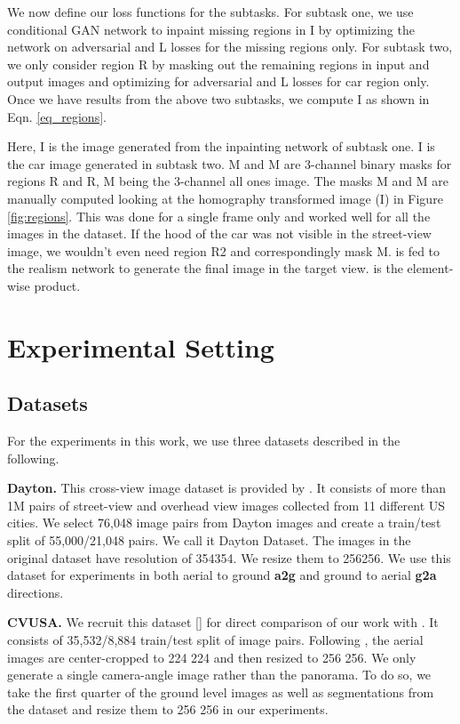 \documentclass[times,twocolumn,final,authoryear]{elsarticle_modified}
\begin{document}
We now define our loss functions for the subtasks.
For subtask one, we use conditional GAN network to inpaint missing regions in I by optimizing the network on adversarial and L losses for the missing regions only. For subtask two, we only consider region R by masking out the remaining regions in input and output images and optimizing for adversarial and L losses for car region only. Once we have results from the above two subtasks, we compute I as shown in Eqn. \ref{eq_regions}. 

\vspace{-15pt}



Here, I is the image generated from the inpainting network of subtask one. I is the car image generated in subtask two. M and M are 3-channel binary masks for regions R and R, M being the 3-channel all ones image. The masks M and M are manually computed looking at the homography transformed image (I) in Figure \ref{fig:regions}. This was done for a single frame only and worked well for all the images in the dataset. If the hood of the car was not visible in the street-view image, we wouldn't even need region R2 and correspondingly mask M.  is fed to the realism network to generate the final image in the target view.  is the element-wise product.


 \vspace{-5pt}
\section{Experimental Setting}
\label{sec:exp_setting}
\vspace{-5pt}
\subsection{Datasets}
For the experiments in this work, we use three datasets described in the following.

\noindent \textbf{Dayton.} This cross-view image dataset is provided by \cite{Vo2016}. It consists of more than 1M pairs of street-view and overhead view images collected from 11 different US cities. We select 76,048 image pairs from Dayton images and create a train/test split of 55,000/21,048 pairs. We call it Dayton Dataset. The images in the original dataset have resolution of 354354. We resize them to 256256. We use this dataset for experiments in both aerial to ground \textbf{a2g} and ground to aerial \textbf{g2a} directions.

\noindent \textbf{CVUSA.}
We recruit this dataset [\cite{workman2015wide}] for direct comparison of our work with \cite{zhai2017crossview}. It consists of 35,532/8,884 train/test split of image pairs. Following \cite{zhai2017crossview}, the aerial images are center-cropped to 224  224 and then resized to 256  256. We only generate a single camera-angle image rather than the panorama. To do so, we take the first quarter of the ground level images as well as segmentations from the dataset and resize them to 256  256 in our experiments. 
\end{document}
